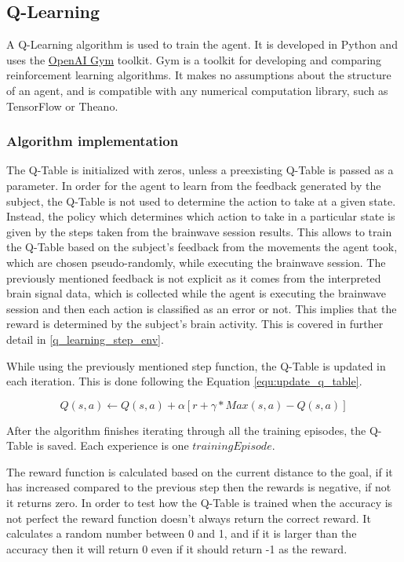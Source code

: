 \documentclass[journal]{IEEEtran}
\begin{document}
\subsection{Q-Learning}{
\label{q_learning_step}
A Q-Learning algorithm is used to train the agent. It is developed in Python and uses the \href{https://gym.openai.com}{OpenAI Gym} toolkit. Gym is a toolkit for developing and comparing reinforcement learning algorithms. It makes no assumptions about the structure of an agent, and is compatible with any numerical computation library, such as TensorFlow or Theano.

\subsubsection{Algorithm implementation}{
\label{q_learning_step_alg}
The Q-Table is initialized with zeros, unless a preexisting Q-Table is passed as a parameter. In order for the agent to learn from the feedback generated by the subject, the Q-Table is not used to determine the action to take at a given state. Instead, the policy which determines which action to take in a particular state is given by the steps taken from the brainwave session results. This allows to train the Q-Table based on the subject's feedback from the movements the agent took, which are chosen pseudo-randomly, while executing the brainwave session. The previously mentioned feedback is not explicit as it comes from the interpreted brain signal data, which is collected while the agent is executing the brainwave session and then each action is classified as an error or not. This implies that the reward is determined by the subject's brain activity. This is covered in further detail in \ref{q_learning_step_env}.

While using the previously mentioned step function, the Q-Table is updated in each iteration. This is done following the Equation \ref{equ:update_q_table}.

\begin{equation}
    Q(s,a) \leftarrow Q(s,a) + \alpha[r+\gamma* Max(s, a)-Q(s, a) ]
    \label{equ:update_q_table}
\end{equation}

After the algorithm finishes iterating through all the training episodes, the Q-Table is saved. Each experience is one $trainingEpisode$.

The reward function is calculated based on the current distance to the goal, if it has increased compared to the previous step then the rewards is negative, if not it returns zero. In order to test how the Q-Table is trained when the accuracy is not perfect the reward function doesn't always return the correct reward. It calculates a random number between 0 and 1, and if it is larger than the accuracy then it will return 0 even if it should return -1 as the reward.

}}
\end{document}
